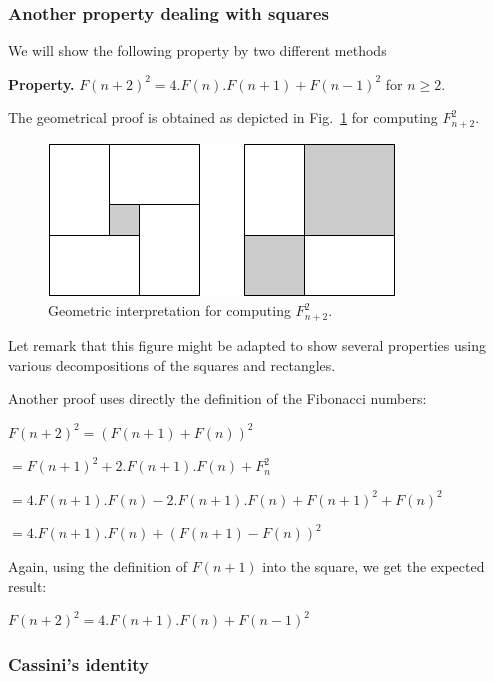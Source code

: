 \subsubsection{Another property dealing with squares}

We will show the following property by two different methods

\noindent \textbf{Property.} 
\label{prop:FiboEmbedded}
$F(n+2)^2 = 4.F(n).F(n+1) + F(n-1)^2$ for $n \geq 2$.


The geometrical proof is obtained as depicted in Fig.~\ref{fig:fibosquareembedded} for computing $F_{n+2}^2$.

\begin{figure}[h]
\begin{center}
        \includegraphics[scale=0.5]{FiguresMaths//FiboSquares}
        \caption{Geometric interpretation for computing $F_{n+2}^2$.}
        \label{fig:fibosquareembedded}
\end{center}
\end{figure}

Let remark that this figure might be adapted to show several properties using various decompositions of the squares and rectangles.

Another proof uses directly the definition of the Fibonacci numbers:


$F(n+2)^2 = (F(n+1) + F(n))^2 $

$= F(n+1)^2+2.F(n+1).F(n)+F_{n}^2$

$= 4.F(n+1).F(n) - 2.F(n+1).F(n) + F(n+1)^2 + F(n)^2$

$= 4.F(n+1).F(n) + (F(n+1) - F(n))^2$

Again, using the definition of $F(n+1)$ into the square, we get the expected result:

$F(n+2)^2 = 4.F(n+1).F(n) + F(n-1)^2$


\subsubsection{Cassini's identity}

